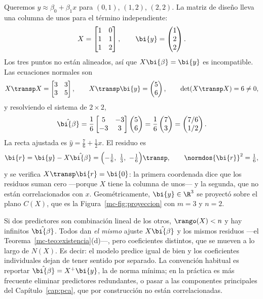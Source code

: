 \begin{example}\label{mc-ej:recta}
Queremos $y\approx\beta_0+\beta_1x$ para $(0,1)$, $(1,2)$, $(2,2)$. La matriz
de diseño lleva una columna de unos para el término independiente:
\[
X=\begin{bmatrix}1&0\\ 1&1\\ 1&2\end{bmatrix},
\qquad
\bi{y}=\begin{pmatrix}1\\ 2\\ 2\end{pmatrix}.
\]
Los tres puntos no están alineados, así que $X\bi{\beta}=\bi{y}$ es
incompatible. Las ecuaciones normales son
\[
X\transp X=\begin{bmatrix}3&3\\ 3&5\end{bmatrix},
\qquad
X\transp\bi{y}=\begin{pmatrix}5\\ 6\end{pmatrix},
\qquad
\det(X\transp X)=6\ne0 ,
\]
y resolviendo el sistema de $2\times2$,
\[
\hat{\bi{\beta}}=\frac16\begin{bmatrix}5&-3\\ -3&3\end{bmatrix}
\begin{pmatrix}5\\ 6\end{pmatrix}
=\frac16\begin{pmatrix}7\\ 3\end{pmatrix}
=\begin{pmatrix}7/6\\ 1/2\end{pmatrix}.
\]
La recta ajustada es $\hat y=\tfrac76+\tfrac12x$. El residuo es
\[
\bi{r}=\bi{y}-X\hat{\bi{\beta}}
=\Bigl(-\tfrac16,\ \tfrac13,\ -\tfrac16\Bigr)\transp ,
\qquad \normdos{\bi{r}}^2=\tfrac16 ,
\]
y se verifica $X\transp\bi{r}=\bi{0}$: la primera coordenada dice que los
residuos suman cero ---porque $X$ tiene la columna de unos--- y la segunda,
que no están correlacionados con $x$. Geométricamente, $\bi{y}\in\R^3$ se
proyectó sobre el plano $C(X)$, que es la Figura~\ref{mc-fig:proyeccion} con
$m=3$ y $n=2$.
\end{example}

\begin{remark}[Colinealidad]\label{mc-obs:colinealidad}
Si dos predictores son combinación lineal de los otros, $\rango(X)<n$ y hay
infinitos $\hat{\bi{\beta}}$. Todos dan \emph{el mismo} ajuste
$X\hat{\bi{\beta}}$ y los mismos residuos ---el
Teorema~\ref{mc-teo:existencia}(d)---, pero coeficientes distintos, que se
mueven a lo largo de $N(X)$. Es decir: el modelo predice igual de bien y los
coeficientes individuales dejan de tener sentido por separado. La convención
habitual es reportar $\hat{\bi{\beta}}=X^{+}\bi{y}$, la de norma mínima; en la
práctica es más frecuente eliminar predictores redundantes, o pasar a las
componentes principales del Capítulo~\ref{cap:pca}, que por construcción no
están correlacionadas.
\end{remark}

